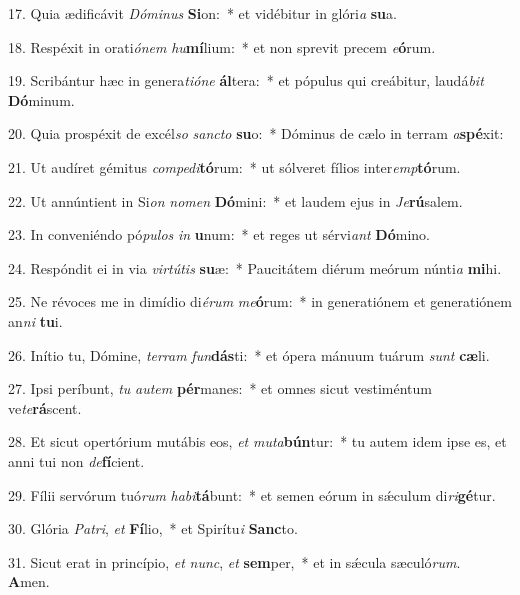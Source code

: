 17. Quia ædificávit \textit{Dó}\textit{mi}\textit{nus} \textbf{Si}on:~*  et vidébitur in glóri\textit{a} \textbf{su}a.\

18. Respéxit in orati\textit{ó}\textit{nem} \textit{hu}\textbf{mí}lium:~*  et non sprevit precem \textit{e}\textbf{ó}rum.\

19. Scribántur hæc in genera\textit{ti}\textit{ó}\textit{ne} \textbf{ál}tera:~*  et pópulus qui creábitur, laudá\textit{bit} \textbf{Dó}minum.\

20. Quia prospéxit de excél\textit{so} \textit{sanc}\textit{to} \textbf{su}o:~*  Dóminus de cælo in terram \textit{a}\textbf{spé}xit:\

21. Ut audíret gémitus \textit{com}\textit{pe}\textit{di}\textbf{tó}rum:~*  ut sólveret fílios inter\textit{emp}\textbf{tó}rum.\

22. Ut annúntient in Si\textit{on} \textit{no}\textit{men} \textbf{Dó}mini:~*  et laudem ejus in \textit{Je}\textbf{rú}salem.\

23. In conveniéndo pó\textit{pu}\textit{los} \textit{in} \textbf{u}num:~*  et reges ut sérvi\textit{ant} \textbf{Dó}mino.\

24. Respóndit ei in via \textit{vir}\textit{tú}\textit{tis} \textbf{su}æ:~*  Paucitátem diérum meórum núnti\textit{a} \textbf{mi}hi.\

25. Ne révoces me in dimídio di\textit{é}\textit{rum} \textit{me}\textbf{ó}rum:~*  in generatiónem et generatiónem an\textit{ni} \textbf{tu}i.\

26. Inítio tu, Dómine, \textit{ter}\textit{ram} \textit{fun}\textbf{dás}ti:~*  et ópera mánuum tuárum \textit{sunt} \textbf{cæ}li.\

27. Ipsi períbunt, \textit{tu} \textit{au}\textit{tem} \textbf{pér}manes:~*  et omnes sicut vestiméntum ve\textit{te}\textbf{rá}scent.\

28. Et sicut opertórium mutábis eos, \textit{et} \textit{mu}\textit{ta}\textbf{bún}tur:~*  tu autem idem ipse es, et anni tui non \textit{de}\textbf{fí}cient.\

29. Fílii servórum tuó\textit{rum} \textit{ha}\textit{bi}\textbf{tá}bunt:~*  et semen eórum in sǽculum di\textit{ri}\textbf{gé}tur.\

30. Glória \textit{Pa}\textit{tri}, \textit{et} \textbf{Fí}lio,~*  et Spirítu\textit{i} \textbf{Sanc}to.\

31. Sicut erat in princípio, \textit{et} \textit{nunc}, \textit{et} \textbf{sem}per,~*  et in sǽcula sæculó\textit{rum}. \textbf{A}men.\

